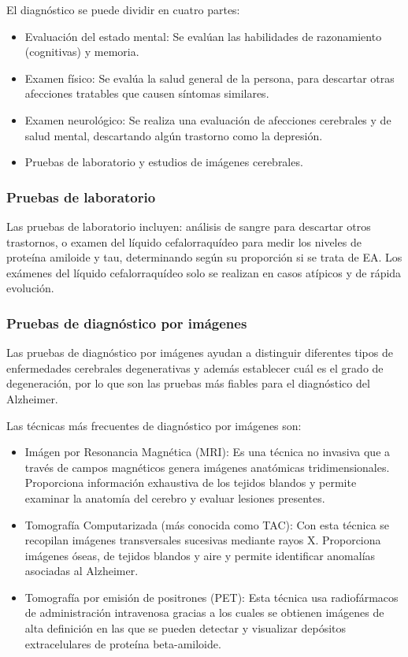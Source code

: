 El diagnóstico se puede dividir en cuatro partes:
\begin{itemize}
    \item Evaluación del estado mental: Se evalúan las habilidades de razonamiento (cognitivas) y memoria.
    \item Examen físico: Se evalúa la salud general de la persona, para descartar otras afecciones tratables que causen
    síntomas similares.
    \item Examen neurológico: Se realiza una evaluación de afecciones cerebrales y de salud mental, descartando algún
    trastorno como la depresión.
    \item Pruebas de laboratorio y estudios de imágenes cerebrales.\\
\end{itemize}

\subsubsection{Pruebas de laboratorio}\label{subsubsec:pruebas-laboratorio-EA}
Las pruebas de laboratorio incluyen: análisis de sangre para descartar otros trastornos, o examen del líquido
cefalorraquídeo para medir los niveles de proteína amiloide y tau, determinando según su proporción si se trata de EA.
Los exámenes del líquido cefalorraquídeo solo se realizan en casos atípicos y de rápida evolución.

\subsubsection{Pruebas de diagnóstico por imágenes}\label{subsubsec:pruebas-imagenes-EA}
Las pruebas de diagnóstico por imágenes ayudan a distinguir diferentes tipos de enfermedades cerebrales degenerativas y
además establecer cuál es el grado de degeneración, por lo que son las pruebas más fiables para el diagnóstico del
Alzheimer.

Las técnicas más frecuentes de diagnóstico por imágenes son:
\begin{itemize}
    \item Imágen por Resonancia Magnética (MRI): Es una técnica no invasiva que a través de campos magnéticos genera imágenes
    anatómicas tridimensionales.
    Proporciona información exhaustiva de los tejidos blandos y permite examinar la anatomía del cerebro y evaluar
    lesiones presentes.
    \item Tomografía Computarizada (más conocida como TAC): Con esta técnica se recopilan imágenes transversales
    sucesivas mediante rayos X. Proporciona imágenes óseas, de tejidos blandos y aire y permite identificar anomalías
    asociadas al Alzheimer.
    \item Tomografía por emisión de positrones (PET): Esta técnica usa radiofármacos de administración intravenosa
    gracias a los cuales se obtienen imágenes de alta definición en las que se pueden detectar y visualizar depósitos
    extracelulares de proteína beta-amiloide.\\
\end{itemize}

